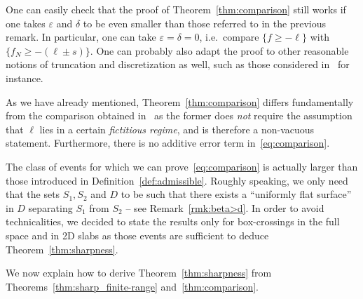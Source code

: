 \documentclass[AHL,Unicode,longabstracts,published]{cedram}
\begin{document}
\begin{rema}\label{rmk:delta=0}
One can easily check that the proof of Theorem~\ref{thm:comparison} still works if one takes $\varepsilon$ and $\delta$ to be even smaller than those referred to in the previous remark. In particular, one can take $\varepsilon=\delta=0$, i.e.~compare $\{f\geq -\ell\}$ with $\{f_N\geq -(\ell\pm s)\}$. One can probably also adapt the proof to other reasonable notions of truncation and discretization as well, such as those considered in~\cite{MV} for instance.
\end{rema}

\begin{rema}\label{rmk:paper_vs_GFF}
As we have already mentioned, Theorem~\ref{thm:comparison} differs fundamentally from the comparison obtained in~\cite[Proposition~1.4]{DGRS19} as the former does \emph{not} require the assumption that $\ell$ lies in a certain \emph{fictitious regime}, and is therefore a non-vacuous statement. Furthermore, there is no additive error term in~\eqref{eq:comparison}.
\end{rema}

\begin{rema}\label{rmk:admissible_events}
The class of events for which we can prove~\eqref{eq:comparison} is actually larger than those introduced in Definition~\ref{def:admissible}. Roughly speaking, we only need that the sets $S_1, S_2$ and $D$ to be such that there exists a ``uniformly flat surface'' in $D$ separating $S_1$ from $S_2$ -- see Remark~\ref{rmk:beta>d}. In order to avoid technicalities, we decided to state the results only for box-crossings in the full space and in 2D slabs as those events are sufficient to deduce Theorem~\ref{thm:sharpness}.
\end{rema}


We now explain how to derive Theorem~\ref{thm:sharpness} from Theorems~\ref{thm:sharp_finite-range} and~\ref{thm:comparison}.
\end{document}

